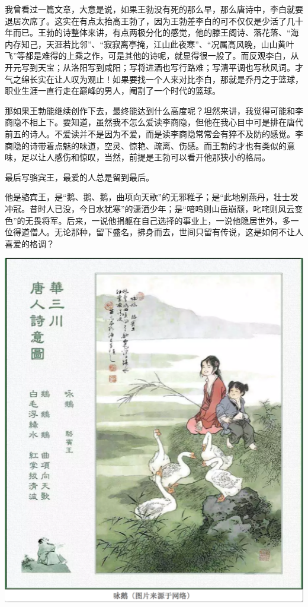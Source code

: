 \documentclass[]{book}
\begin{document}
我曾看过一篇文章，大意是说，如果王勃没有死的那么早，那么唐诗中，李白就要退居次席了。这实在有点太抬高王勃了，因为王勃差李白的可不仅仅是少活了几十年而已。王勃的诗整体来讲，有点两极分化的感觉，他的滕王阁诗、落花落、``海内存知己，天涯若比邻''、``寂寂离亭掩，江山此夜寒''、``况属高风晚，山山黄叶飞''等都是难得的上乘之作，可是其他的诗呢，就显得很一般了。而反观李白，从开元写到天宝；从洛阳写到咸阳；写将进酒也写行路难；写清平调也写秋风词。才气之绵长实在让人叹为观止！如果要找一个人来对比李白，那就是乔丹之于篮球，职业生涯一直行走在巅峰的男人，阉割了一个时代的篮球。

那如果王勃能继续创作下去，最终能达到什么高度呢？坦然来讲，我觉得可能和李商隐不相上下。要知道，虽然我不怎么爱读李商隐，但他在我心目中可是排在唐代前五的诗人。不爱读并不是因为不爱，而是读李商隐常常会有猝不及防的感觉。李商隐的诗带着点魅的味道，空灵、惊艳、疏离、伤感。而王勃的才也有类似的意味，足以让人感伤和惊叹，当然，前提是王勃可以看开他那狭小的格局。

最后写骆宾王，最爱的人总是留到最后。

他是骆宾王，是``鹅、鹅、鹅，曲项向天歌''的无邪稚子；是``此地别燕丹，壮士发冲冠。昔时人已没，今日水犹寒''的潇洒少年；是``喑呜则山岳崩颓，叱咤则风云变色''的无畏将军。后来，一说他捐躯在自己选择的事业上，一说他隐居世外，多一位得道僧人。无论那种，留下盛名，拂身而去，世间只留有传说，这是如何不让人喜爱的格调？

\includegraphics[width=7.25in]{images/ctsj7}
\end{document}
